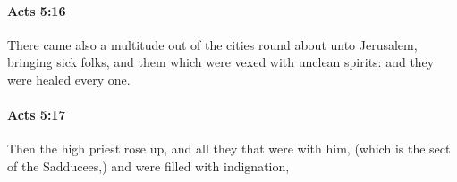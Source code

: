 		\paragraph{Acts 5:16} %
			\label{ACTS-5-16}

			There came also a multitude out of the cities round about unto Jerusalem, bringing sick folks, and them which were vexed with unclean spirits: and they were healed every one.

			\begin{framed}
			\scriptsize
				\begin{compactdesc}
					\item[SBLG] 
				\end{compactdesc}
			\end{framed}

		\paragraph{Acts 5:17} %
			\label{ACTS-5-17}

			Then the high priest rose up, and all they that were with him, (which is the sect of the Sadducees,) and were filled with indignation,

